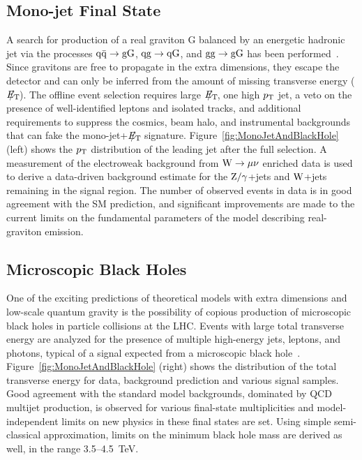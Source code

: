 \documentclass[11pt]{article}
\def\etmiss {\ensuremath{E_{\mathrm{T}}\hspace{-1.1em}/\kern0.5em}\xspace}
\def\pt{\ensuremath{p_{\rm T}}\xspace}
\def\zjets{\ensuremath{\rm{Z}/\gamma}+jets\xspace}
\def\wjets{\ensuremath{\rm{W}}+jets\xspace}
\begin{document}
\subsection{Mono-jet Final State}
A search for production of a real graviton G 
balanced by an energetic hadronic jet via the processes 
$\rm{q}\bar{\rm{q}} \rightarrow \rm{gG}$, $\rm{q}\rm{g} \rightarrow \rm{qG}$, 
and $\rm{g}\rm{g} \rightarrow \rm{gG}$ has been performed~\cite{CMSPAPER:EXO-11-003}. 
Since gravitons are free to propagate in the extra dimensions, they escape 
the detector and can only be inferred from the amount of missing transverse energy (\etmiss). 
The offline event selection requires large \etmiss, one high \pt jet, a veto on the 
presence of well-identified leptons and isolated tracks, and additional 
requirements to suppress the cosmics, beam halo, and instrumental backgrounds 
that can fake the mono-jet+\etmiss signature. 
Figure~\ref{fig:MonoJetAndBlackHole} (left) shows the \pt distribution of the leading jet after the full selection. 
A measurement of the electroweak background from $\rm{W} \rightarrow \mu\nu$ enriched 
data is used to derive a data-driven background estimate for the \zjets and \wjets remaining 
in the signal region. The number of observed events in data is in good agreement with the SM prediction, 
and significant improvements are made to the current limits on the fundamental parameters of 
the model describing real-graviton emission.

\subsection{Microscopic Black Holes}
One of the exciting predictions of theoretical models with extra dimensions 
and low-scale quantum gravity is the possibility of copious production of microscopic black 
holes in particle collisions at the LHC.
Events with large total transverse energy are analyzed for the presence
of multiple high-energy jets, leptons, and photons, typical of a signal expected from a microscopic black 
hole~\cite{Khachatryan2011434}. 
Figure~\ref{fig:MonoJetAndBlackHole} (right) shows the distribution of the total transverse energy for data, 
background prediction and various signal samples. Good agreement with the standard model backgrounds, 
dominated by QCD multijet production, is observed for various final-state multiplicities 
and model-independent limits on new physics in these final states are set. 
Using simple semi-classical approximation, limits on the minimum black hole 
mass are derived as well, in the range 3.5--4.5~TeV.
\end{document}
